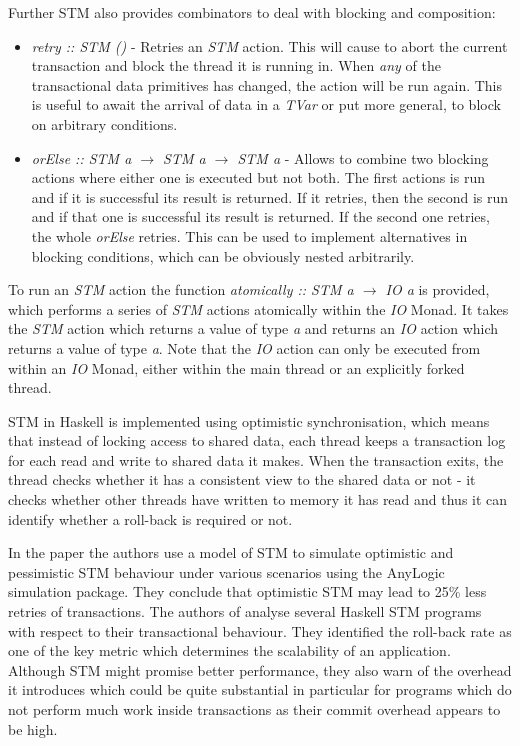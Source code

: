 Further STM also provides combinators to deal with blocking and composition:

\begin{itemize}
	\item \textit{retry :: STM ()} - Retries an \textit{STM} action. This will cause to abort the current transaction and block the thread it is running in. When \textit{any} of the transactional data primitives has changed, the action will be run again. This is useful to await the arrival of data in a \textit{TVar} or put more general, to block on arbitrary conditions. 
	
	\item \textit{orElse :: STM a $\rightarrow$ STM a $\rightarrow$ STM a} - Allows to combine two blocking actions where either one is executed but not both. The first actions is run and if it is successful its result is returned. If it retries, then the second is run and if that one is successful its result is returned. If the second one retries, the whole \textit{orElse} retries. This can be used to implement alternatives in blocking conditions, which can be obviously nested arbitrarily.
\end{itemize}

To run an \textit{STM} action the function \textit{atomically :: STM a $\rightarrow$ IO a} is provided, which performs a series of \textit{STM} actions atomically within the \textit{IO} Monad. It takes the \textit{STM} action which returns a value of type \textit{a} and returns an \textit{IO} action which returns a value of type \textit{a}. Note that the \textit{IO} action can only be executed from within an \textit{IO} Monad, either within the main thread or an explicitly forked thread.

STM in Haskell is implemented using optimistic synchronisation, which means that instead of locking access to shared data, each thread keeps a transaction log for each read and write to shared data it makes. When the transaction exits, the thread checks whether it has a consistent view to the shared data or not - it checks whether other threads have written to memory it has read and thus it can identify whether a roll-back is required or not. %

In the paper \cite{heindl_modeling_2009} the authors use a model of STM to simulate optimistic and pessimistic STM behaviour under various scenarios using the AnyLogic simulation package. They conclude that optimistic STM may lead to 25\% less retries of transactions. The authors of \cite{perfumo_limits_2008} analyse several Haskell STM programs with respect to their transactional behaviour. They identified the roll-back rate as one of the key metric which determines the scalability of an application. Although STM might promise better performance, they also warn of the overhead it introduces which could be quite substantial in particular for programs which do not perform much work inside transactions as their commit overhead appears to be high.

